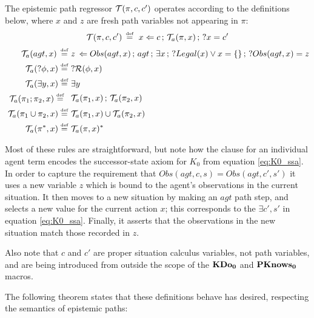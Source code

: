 \begin{defnL}
 The epistemic path regressor
$\mathcal{T}(\pi,c,c')$ operates according to the definitions below, where
$x$ and $z$ are fresh path variables not appearing in $\pi$:\label{def:EpistemicPathRegression}\[
\mathcal{T}(\pi,c,c')\,\stackrel{\mbox{\tiny def}}{=}\,\, x\Leftarrow c\,;\,\mathcal{T}_{a}(\pi,x)\,;\,?x=c'\]
 \begin{align*}
\mathcal{T}_{a}(agt,x)\,\stackrel{\mbox{\tiny def}}{=}\,\, & z\,\Leftarrow Obs(agt,x)\,;\, agt\,;\,\exists x\,;\,?Legal(x)\vee x=\{\}\,;\,?Obs(agt,x)=z\\
\mathcal{T}_{a}(?\phi,x)\stackrel{\mbox{\tiny def}}{=}\,\, & ?\mathcal{R}(\phi,x)\\
\mathcal{T}_{a}(\exists y,x)\stackrel{\mbox{\tiny def}}{=}\,\, & \exists y\\
\begin{array}{c}
\mathcal{T}_{a}(\pi_{1};\pi_{2},x)\stackrel{\mbox{\tiny def}}{=}\,\,\end{array} & \mathcal{T}_{a}(\pi_{1},x)\,;\,\mathcal{T}_{a}(\pi_{2},x)\\
\mathcal{T}_{a}(\pi_{1}\cup\pi_{2},x)\stackrel{\mbox{\tiny def}}{=}\,\, & \mathcal{T}_{a}(\pi_{1},x)\cup\mathcal{T}_{a}(\pi_{2},x)\\
\mathcal{T}_{a}(\pi^{*},x)\stackrel{\mbox{\tiny def}}{=}\,\, & \mathcal{T}_{a}(\pi,x)^{*}\end{align*}

\end{defnL}
Most of these rules are straightforward, but note how the clause for
an individual agent term encodes the successor-state axiom for $K_{0}$
from equation \eqref{eq:K0_ssa}. In order to capture the requirement
that $Obs(agt,c,s)=Obs(agt,c',s')$ it uses a new variable $z$ which
is bound to the agent's observations in the current situation. It
then moves to a new situation by making an $agt$ path step, and selects
a new value for the current action $x$; this corresponds to the $\exists c',s'$
in equation \eqref{eq:K0_ssa}. Finally, it asserts that the observations
in the new situation match those recorded in $z$.

Also note that $c$ and $c'$ are proper situation calculus variables,
not path variables, and are being introduced from outside the scope
of the $\mathbf{KDo_{0}}$ and $\mathbf{PKnows_{0}}$ macros.

The following theorem states that these definitions behave has desired,
respecting the semantics of epistemic paths:

